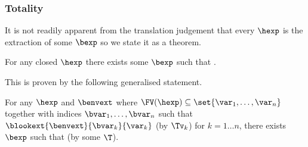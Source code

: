 \subsubsection{Totality}

It is not readily apparent from the translation judgement that every $\hexp$ is the extraction of some $\bexp$ so we state it as a theorem.

\begin{theorem}[Totality]
\label{thm:totality}
For any closed $\hexp$ there exists some $\bexp$ such that \trahb{\hbctx}{\envnil}{\bexp}{\hexp}.
\end{theorem}

This is proven by the following generalised statement.

\begin{lemma}
\label{lem:totality}
For any $\hexp$ and $\benvext$ where $\FV(\hexp) \subseteq \set{\var_1, \ldots, \var_n}$ together with indices $\bvar_1, \ldots, \bvar_n$ such that $\blookext{\benvext}{\bvar_k}{\var_k}$ (by $\Tv_k$) for $k = 1 \ldots n$, there exists $\bexp$ such that \trahb{\hbctx}{\benvext}{\bexp}{\hexp} (by some $\T$).
\end{lemma}

